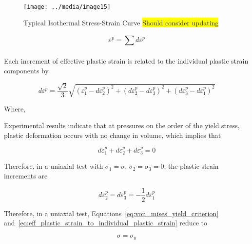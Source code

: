 \begin{figure}
    \texttt{[image: ../media/image15]}
    \caption{Typical Isothermal Stress-Strain Curve \colorbox{yellow}{Should consider updating}}
    \label{fig:isothermal_stress_strain_curve}
\end{figure}

\begin{equation}
    \label{eq:sum_plastic_strain_increments}
    \varepsilon^{p} = \sum_{}^{}{d\varepsilon^{p}}
\end{equation}

Each increment of effective plastic strain is related to the individual plastic strain components by

\begin{equation}
    \label{eq:eff_plastic_strain_to_individual_plastic_strain}
    d\varepsilon^{p} = \frac{\sqrt{2}}{3}\sqrt{\left( \varepsilon_{1}^{p} - d\varepsilon_{2}^{p} \right)^{2} + \left( d\varepsilon_{2}^{p} - d\varepsilon_{3}^{p} \right)^{2} + \left( d\varepsilon_{3}^{p} - d\varepsilon_{1}^{p} \right)^{2}}
\end{equation}

Where,

Experimental results indicate that at pressures on the order of the yield stress, plastic
deformation occurs with no change in volume, which implies that

\begin{equation}
    d\varepsilon_{1}^{p} + d\varepsilon_{2}^{p} + d\varepsilon_{3}^{p} = 0
    \label{eq:plastic_deformation_no_volume_change}
\end{equation}

Therefore, in a uniaxial test with $\sigma_{1}=\sigma$, $\sigma_{2}=\sigma_{3}= 0$, the plastic
strain increments are

\begin{equation}
    \label{eq:plastic_strain_increment_uniaxial_test}
    d\varepsilon_{2}^{p} = d\varepsilon_{3}^{p} = - \frac{1}{2}d\varepsilon_{1}^{p}
\end{equation}

Therefore, in a uniaxial test, Equations~\ref{eq:von_mises_yield_criterion}
and~\ref{eq:eff_plastic_strain_to_individual_plastic_strain} reduce to

\begin{equation}
    \label{eq:stress_equals_yield_stress}
    \sigma = \sigma_{y}
\end{equation}

